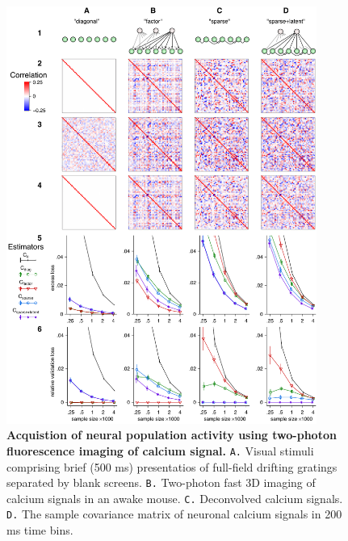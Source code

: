 \begin{figure}[!ht]
\begin{center}
\includegraphics[width=4in]{figures/Figure1.pdf}
\end{center}
\caption{
{\bf Acquistion of neural population activity using two-photon fluorescence imaging of calcium signal.}  {\tt A.} Visual stimuli comprising brief (500 ms) presentatios of full-field drifting gratings separated by blank screens. {\tt B.} Two-photon fast 3D imaging of calcium signals in an awake mouse. {\tt C.} Deconvolved calcium signals. {\tt D.} The sample covariance matrix of neuronal calcium signals in 200 ms time bins. 
}
\label{Figure_label}
\end{figure}
